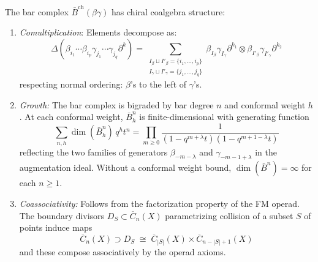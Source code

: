 \begin{proposition}\label{prop:bg-bar-coalg}
The bar complex $\bar{B}^{\text{ch}}(\beta\gamma)$ has chiral coalgebra structure:
\begin{enumerate}
\item \emph{Comultiplication}: Elements decompose as:
\[
\Delta(\beta_{i_1} \cdots \beta_{i_p} \gamma_{j_1} \cdots \gamma_{j_q} \partial^k) =
\sum_{\substack{I_\beta \sqcup I'_\beta = \{i_1,\ldots,i_p\} \\ I_\gamma \sqcup I'_\gamma = \{j_1,\ldots,j_q\}}}
\beta_{I_\beta}\gamma_{I_\gamma}\partial^{k_1} \otimes \beta_{I'_\beta}\gamma_{I'_\gamma}\partial^{k_2}
\]
respecting normal ordering: $\beta$'s to the left of $\gamma$'s.

\item \emph{Growth:} The bar complex is bigraded by bar degree $n$ and conformal weight $h$. At each conformal weight, $\bar{B}^n_h$ is finite-dimensional with generating function
\[\sum_{n,h} \dim(\bar{B}^n_h)\, q^h t^n = \prod_{m \geq 0} \frac{1}{(1-q^{m+\lambda}t)(1-q^{m+1-\lambda}t)}\]
reflecting the two families of generators $\beta_{-m-\lambda}$ and $\gamma_{-m-1+\lambda}$ in the augmentation ideal. Without a conformal weight bound, $\dim(\bar{B}^n) = \infty$ for each $n \geq 1$.

\item \emph{Coassociativity:} Follows from the factorization property of the FM operad. The boundary divisors $D_S \subset \overline{C}_{n}(X)$ parametrizing collision of a subset $S$ of points induce maps
\[
\overline{C}_{n}(X) \supset D_S \;\cong\; \overline{C}_{|S|}(X) \times \overline{C}_{n-|S|+1}(X)
\]
and these compose associatively by the operad axioms.
\end{enumerate}
\end{proposition}

